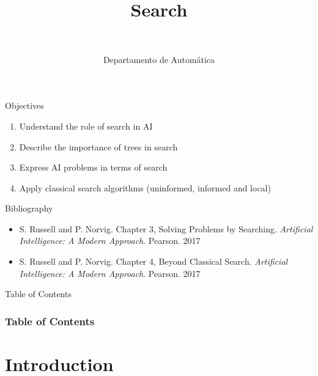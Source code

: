 \documentclass[10pt,compress]{beamer} %
\title[Search]{Search}
\author{\asignatura\\\carrera}
\institute{}
\date{Departamento de Automática}
\begin{document}
{\titlepageBlue
    \begin{frame}
        \titlepage
    \end{frame}
}

\institute{\asignatura}

\begin{frame}[plain]{}
   \begin{block}{Objectives}
      \begin{enumerate}
         \item Understand the role of search in AI
         \item Describe the importance of trees in search
         \item Express AI problems in terms of search
         \item Apply classical search algorithms (uninformed, informed and local)
      \end{enumerate} 
   \end{block}

   \begin{block}{Bibliography}
	\begin{itemize}
        \item S. Russell and P. Norvig. Chapter 3, Solving Problems by Searching. \textit{Artificial Intelligence: A Modern Approach}. Pearson. 2017
        \item S. Russell and P. Norvig. Chapter 4, Beyond Classical Search. \textit{Artificial Intelligence: A Modern Approach}. Pearson. 2017
	\end{itemize}
   \end{block}
\end{frame}

{
\begin{frame}[shrink]{Table of Contents}
 \frametitle{Table of Contents}
 \tableofcontents
\end{frame}
}

\section{Introduction}
\end{document}
